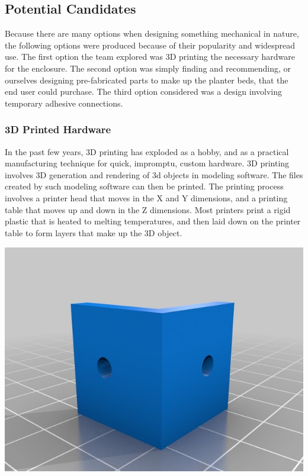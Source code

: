 	\subsection{Potential Candidates}
	Because there are many options when designing something mechanical in nature, the following options were produced because of their popularity and widespread use.  The
	first option the team explored was 3D printing the necessary hardware for the enclosure.  The second option was simply finding and recommending, or ourselves designing
	pre-fabricated parts to make up the planter beds, that the end user could purchase.  The third option considered was a design involving temporary adhesive connections.

	\subsubsection{3D Printed Hardware}
	In the past few years, 3D printing has exploded as a hobby, and as a practical manufacturing technique for quick, impromptu, custom hardware.  3D printing involves 3D
	generation and rendering of 3d objects in modeling software.  The files created by such modeling software can then be printed.  The printing process involves a printer
	head that moves in the X and Y dimensions, and a printing table that moves up and down in the Z dimensions.  Most printers print a rigid plastic that is heated to
	melting temperatures, and then laid down on the printer table to form layers that make up the 3D object.

	\begin{center}
		\includegraphics[scale=0.5]{techreview/90-degree-bracket.jpg}
	\end{center} \cite{IMG3}

